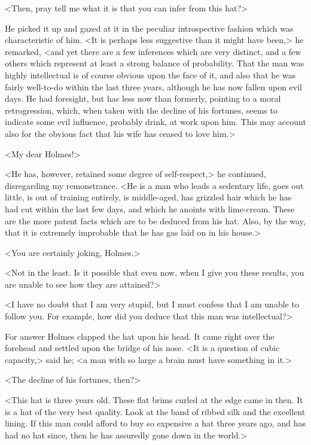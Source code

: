 <Then, pray tell me what it is that you can infer from this hat?>

He picked it up and gazed at it in the peculiar introspective fashion which was characteristic of him. <It is perhaps less suggestive than it might have been,> he remarked, <and yet there are a few inferences which are very distinct, and a few others which represent at least a strong balance of probability. That the man was highly intellectual is of course obvious upon the face of it, and also that he was fairly well-to-do within the last three years, although he has now fallen upon evil days. He had foresight, but has less now than formerly, pointing to a moral retrogression, which, when taken with the decline of his fortunes, seems to indicate some evil influence, probably drink, at work upon him. This may account also for the obvious fact that his wife has ceased to love him.>

<My dear Holmes!>

<He has, however, retained some degree of self-respect,> he continued, disregarding my remonstrance. <He is a man who leads a sedentary life, goes out little, is out of training entirely, is middle-aged, has grizzled hair which he has had cut within the last few days, and which he anoints with lime-cream. These are the more patent facts which are to be deduced from his hat. Also, by the way, that it is extremely improbable that he has gas laid on in his house.>

<You are certainly joking, Holmes.>

<Not in the least. Is it possible that even now, when I give you these results, you are unable to see how they are attained?>

<I have no doubt that I am very stupid, but I must confess that I am unable to follow you. For example, how did you deduce that this man was intellectual?>

For answer Holmes clapped the hat upon his head. It came right over the forehead and settled upon the bridge of his nose. <It is a question of cubic capacity,> said he; <a man with so large a brain must have something in it.>

<The decline of his fortunes, then?>

<This hat is three years old. These flat brims curled at the edge came in then. It is a hat of the very best quality. Look at the band of ribbed silk and the excellent lining. If this man could afford to buy so expensive a hat three years ago, and has had no hat since, then he has assuredly gone down in the world.>

